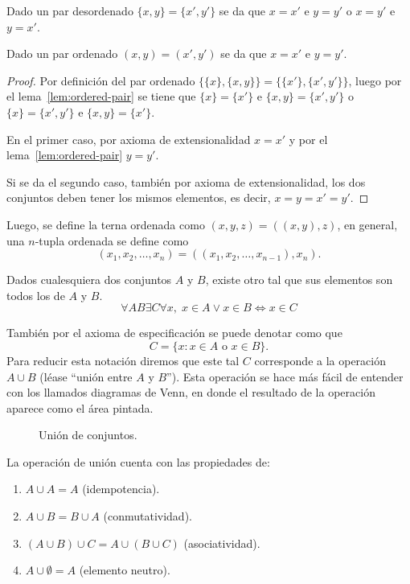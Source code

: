 \documentclass[11pt,oneside,a4paper]{book}
\begin{document}
\begin{lem}\label{lem:ordered-pair}
Dado un par desordenado $\{x,y\}=\{x',y'\}$ se da que $x=x'$ e $y=y'$ o $x=y'$ e $y=x'$.
\end{lem}
\begin{thm}
Dado un par ordenado $(x,y)=(x',y')$ se da que $x=x'$ e $y=y'$.
\end{thm}
\begin{proof}
Por definición del par ordenado $\{\{x\},\{x,y\}\}=\{\{x'\},\{x',y'\}\}$, luego por el lema~\ref{lem:ordered-pair} se tiene que $\{x\}=\{x'\}$ e $\{x,y\}=\{x',y'\}$ o $\{x\}=\{x',y'\}$ e $\{x,y\}=\{x'\}$.

En el primer caso, por axioma de extensionalidad $x=x'$ y por el lema~\ref{lem:ordered-pair} $y=y'$.

Si se da el segundo caso, también por axioma de extensionalidad, los dos conjuntos deben tener los mismos elementos, es decir, $x=y=x'=y'$.
\end{proof}

Luego, se define la terna ordenada como $(x,y,z)=((x,y),z)$, en general, una $n$-tupla ordenada se define como
$$(x_1,x_2,\dots,x_n)=((x_1,x_2,\dots,x_{n-1}),x_n).$$
\begin{axiom}[de Unión]
Dados cualesquiera dos conjuntos $A$ y $B$, existe otro tal que sus elementos son todos los de $A$ y $B$.
$$
\forall AB\exists C\forall x,\;x\in A\vee x\in B\iff x\in C
$$
\end{axiom}
También por el axioma de especificación se puede denotar como que
$$C=\{x:x\in A\text{ o }x\in B\}.$$
Para reducir esta notación diremos que este tal $C$ corresponde a la operación $A\cup B$ (léase ``unión entre $A$ y $B$''). Esta operación se hace más fácil de entender con los llamados diagramas de Venn, en donde el resultado de la operación aparece como el área pintada.
\begin{figure}
\centering
{}
\caption{Unión de conjuntos.}
\end{figure}

\begin{prop}
La operación de unión cuenta con las propiedades de:
\begin{enumerate}
\item $A\cup A=A$ (idempotencia).
\item $A\cup B=B\cup A$ (conmutatividad).
\item $(A\cup B)\cup C=A\cup(B\cup C)$ (asociatividad).
\item $A\cup\emptyset=A$ (elemento neutro).
\end{enumerate}
\end{prop}
\end{document}
